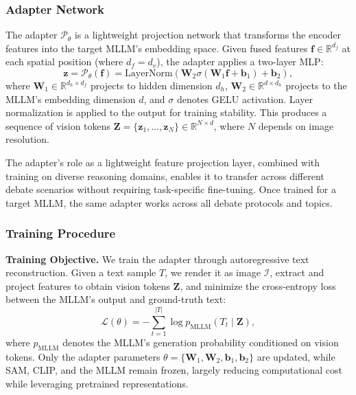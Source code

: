 \documentclass{article}
\theoremstyle{plain}
\theoremstyle{definition}
\theoremstyle{remark}
\begin{document}
\subsubsection{Adapter Network}
\label{subsubsec:adapter_network}

The adapter $\mathcal{P}_\theta$ is a lightweight projection network that transforms 
the encoder features into the target MLLM's embedding space. Given fused 
features $\mathbf{f} \in \mathbb{R}^{d_f}$ at each spatial position (where $d_f = d_v$), 
the adapter applies a two-layer MLP:
\begin{equation}
\label{eq:adapter_projection}
    \mathbf{z} = \mathcal{P}_\theta(\mathbf{f}) = \text{LayerNorm}(\mathbf{W}_2 \sigma(\mathbf{W}_1 \mathbf{f} + \mathbf{b}_1) + \mathbf{b}_2),
\end{equation}
where $\mathbf{W}_1 \in \mathbb{R}^{d_h \times d_f}$ projects to hidden dimension 
$d_h$, $\mathbf{W}_2 \in \mathbb{R}^{d \times d_h}$ projects to the MLLM's embedding 
dimension $d$, and $\sigma$ denotes GELU activation. Layer normalization is applied 
to the output for training stability. This produces a sequence of vision tokens $\mathbf{Z} = \{\mathbf{z}_1, \ldots, 
\mathbf{z}_N\} \in \mathbb{R}^{N \times d}$, where $N$ depends on image resolution.


The adapter's role as a lightweight feature projection layer, combined with training 
on diverse reasoning domains, enables it to transfer across different debate scenarios 
without requiring task-specific fine-tuning. Once trained for a target MLLM, the 
same adapter works across all debate protocols and topics.

\subsubsection{Training Procedure}
\label{subsubsec:training_procedure}

\textbf{Training Objective.}
We train the adapter through autoregressive text reconstruction. Given a text sample 
$T$, we render it as image $\mathcal{I}$, extract and project features to obtain 
vision tokens $\mathbf{Z}$, and minimize the cross-entropy loss between the MLLM's 
output and ground-truth text:
\begin{equation}
\label{eq:training_loss}
    \mathcal{L}(\theta) = -\sum_{t=1}^{|T|} \log p_{\text{MLLM}}(T_t \mid \mathbf{Z}),
\end{equation}
where $p_{\text{MLLM}}$ denotes the MLLM's generation probability conditioned on 
vision tokens. Only the adapter parameters $\theta = \{\mathbf{W}_1, \mathbf{W}_2, 
\mathbf{b}_1, \mathbf{b}_2\}$ are updated, while SAM, CLIP, and the MLLM remain frozen,
largely reducing computational cost while leveraging pretrained representations.
\end{document}
